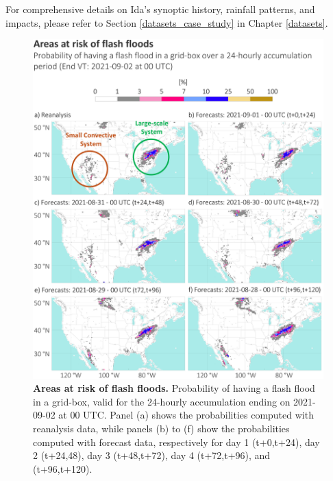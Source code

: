 \documentclass[nhess, manuscript]{copernicus}
\begin{document}
For comprehensive details on Ida's synoptic history, rainfall patterns, and impacts, please refer to Section \ref{datasets_case_study} in Chapter \ref{datasets}.

\begin{figure}[t]
\includegraphics[width=12cm]{figures/case_study_poff.png}
\caption{\textbf{Areas at risk of flash floods.} Probability of having a flash flood in a grid-box, valid for the 24-hourly accumulation ending on 2021-09-02 at 00 UTC. Panel (a) shows the probabilities computed with reanalysis data, while panels (b) to (f) show the probabilities computed with forecast data, respectively for day 1 (t+0,t+24), day 2 (t+24,48), day 3 (t+48,t+72), day 4 (t+72,t+96), and (t+96,t+120).}
\label{fig:case_study_poff}
\end{figure}
\end{document}
